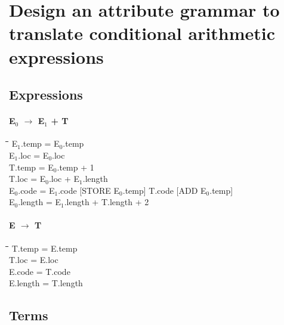\section{Design an attribute grammar to translate conditional arithmetic expressions}

\subsection{Expressions}
\paragraph{E$_{0}$ $\rightarrow$ E$_{1}$ + T}
\begin{tabbing}
	\hspace*{0.5cm}\=\hspace*{3.3cm}\=\hspace*{0.5cm}\=\hspace*{10cm}\= \kill
	\>E$_{1}$.temp 		\>= \>E$_{0}$.temp \\
	\>E$_{1}$.loc 		\>= \>E$_{0}$.loc \\
	\>T.temp 					\>= \>E$_{0}$.temp + 1 \\
	\>T.loc 					\>= \>E$_{0}$.loc + E$_{1}$.length \\
	\>E$_{0}$.code 		\>= \>E$_{1}$.code [STORE E$_{0}$.temp] T.code [ADD E$_{0}$.temp] \\
	\>E$_{0}$.length	\>= \>E$_{1}$.length + T.length + 2
\end{tabbing}

\paragraph{E $\rightarrow$ T}
\begin{tabbing}
	\hspace*{0.5cm}\=\hspace*{3.3cm}\=\hspace*{0.5cm}\=\hspace*{10cm}\= \kill
	\>T.temp 		\>= \>E.temp \\
	\>T.loc 		\>= \>E.loc \\
	\>E.code 		\>= \>T.code \\
	\>E.length	\>= \>T.length
\end{tabbing}

\subsection{Terms}
